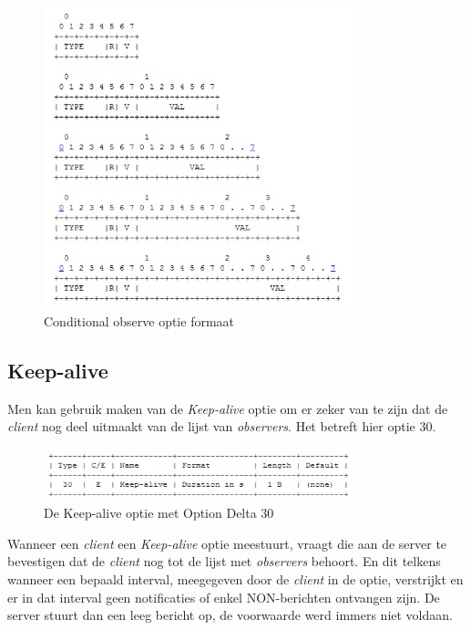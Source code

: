 \begin{figure}[h!]
\centering
\includegraphics[width=0.8\textwidth]{fig/conditional_format}
\caption{Conditional observe optie formaat}
\end{figure}

\subsection{Keep-alive}

Men kan gebruik maken van de \textit{Keep-alive} optie om er zeker van te zijn dat de \textit{client} nog deel uitmaakt van de lijst van \textit{observers}. Het betreft hier optie 30.\\

\begin{figure}[h!]
\centering
\includegraphics[width=0.8\textwidth]{fig/keep_alive}
\caption{De Keep-alive optie met Option Delta 30}
\end{figure}

Wanneer een \textit{client} een \textit{Keep-alive} optie meestuurt, vraagt die aan de server te bevestigen dat de \textit{client} nog tot de lijst met \textit{observers} behoort. En dit telkens wanneer een bepaald interval, meegegeven door de \textit{client} in de optie, verstrijkt en er in dat interval geen notificaties of enkel NON-berichten ontvangen zijn. De server stuurt dan een leeg bericht op, de voorwaarde werd immers niet voldaan.

